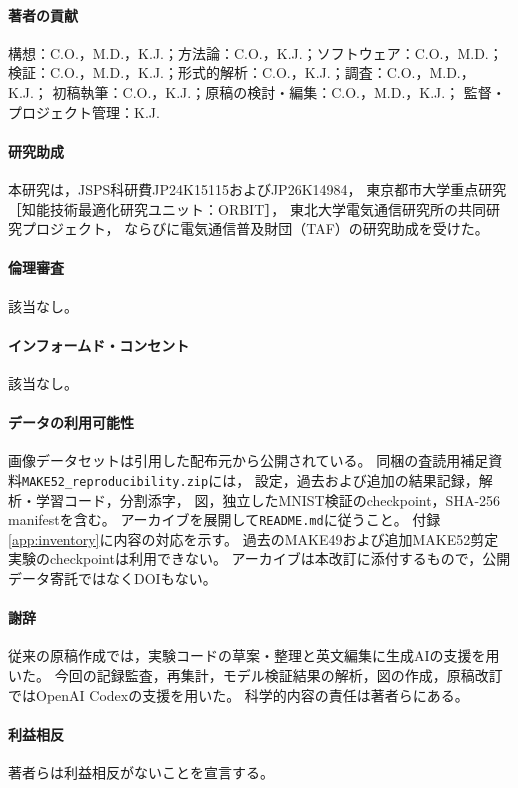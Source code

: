 \documentclass[11pt,a4paper]{ltjsarticle}
\begin{document}
\paragraph{著者の貢献}
構想：C.O.，M.D.，K.J.；方法論：C.O.，K.J.；ソフトウェア：C.O.，M.D.；
検証：C.O.，M.D.，K.J.；形式的解析：C.O.，K.J.；調査：C.O.，M.D.，K.J.；
初稿執筆：C.O.，K.J.；原稿の検討・編集：C.O.，M.D.，K.J.；
監督・プロジェクト管理：K.J.
\paragraph{研究助成}
本研究は，JSPS科研費JP24K15115およびJP26K14984，
東京都市大学重点研究［知能技術最適化研究ユニット：ORBIT］，
東北大学電気通信研究所の共同研究プロジェクト，
ならびに電気通信普及財団（TAF）の研究助成を受けた。
\paragraph{倫理審査}該当なし。
\paragraph{インフォームド・コンセント}該当なし。
\paragraph{データの利用可能性}
画像データセットは引用した配布元から公開されている。
同梱の査読用補足資料\texttt{MAKE52\_reproducibility.zip}には，
設定，過去および追加の結果記録，解析・学習コード，分割添字，
図，独立したMNIST検証のcheckpoint，SHA-256 manifestを含む。
アーカイブを展開して\texttt{README.md}に従うこと。
付録\ref{app:inventory}に内容の対応を示す。
過去のMAKE49および追加MAKE52剪定実験のcheckpointは利用できない。
アーカイブは本改訂に添付するもので，公開データ寄託ではなくDOIもない。
\paragraph{謝辞}
従来の原稿作成では，実験コードの草案・整理と英文編集に生成AIの支援を用いた。
今回の記録監査，再集計，モデル検証結果の解析，図の作成，原稿改訂ではOpenAI Codexの支援を用いた。
科学的内容の責任は著者らにある。
\paragraph{利益相反}著者らは利益相反がないことを宣言する。

\clearpage
\appendix
\end{document}
